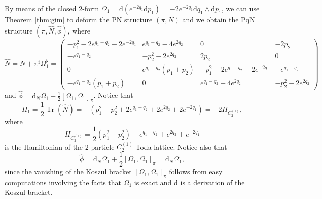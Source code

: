 \documentclass[12pt]{article}
\def\d{{\mathrm d}}
\def\Tr{\operatorname{Tr}}
\begin{document}
By means of the closed 2-form $\Omega_1=\d(e^{-2q_1}\d p_1)=-2e^{-2q_1}\d q_1\wedge \d p_1$, we can use Theorem 
\ref{thm:gim} to deform the PN structure $(\pi,N)$ and we obtain the PqN structure $(\pi,\widehat{N},\widehat{\phi})$, where \begin{equation}
\widehat{N}=N+\pi^{\sharp}\Omega_1^{\flat}=\left( \begin {array}{cc|cc}
-p_1^2-2e^{q_1-q_2}-2e^{-2q_1} & e^{q_1-q_2}-4e^{2q_2} & 0 & -2p_2\\
-e^{q_1-q_2} & -p_2^2-2e^{2q_2} & 2p_2 & 0\\
\hline
0 & e^{q_1-q_2}(p_1+p_2) & -p_1^2-2e^{q_1-q_2}-2e^{-2q_1} & -e^{q_1-q_2}\\
-e^{q_1-q_2}(p_1+p_2) & 0 & e^{q_1-q_2}-4e^{2q_2} & -p_2^2-2e^{2q_2}
\end{array}\right)
\label{eq: periodic C2 (1,1) tensor}
\end{equation}
and $\widehat{\phi}=\d_{N}\Omega_1+\frac{1}{2}\left[\Omega_1,\Omega_1\right]_\pi$. Notice that 
\[
H_1=
\frac{1}{2}\Tr(\widehat{N})=-\left(p_1^2+p_2^2+2e^{q_1-q_2}+2e^{2q_2}+2e^{-2q_1}\right)=-2H_{C_2^{(1)}},
\]
where
\[
H_{C_2^{(1)}}=\frac{1}{2}\left(p_1^2+p_2^2\right)+e^{q_1-q_2}+e^{2q_2}+e^{-2q_1}
\]
is the Hamiltonian of the 2-particle $C_2^{(1)}$-Toda lattice. Notice also that
\begin{equation}
\widehat{\phi}=\d_{N}\Omega_1+\frac{1}{2}{\left[\Omega_1,\Omega_1\right]_\pi}
=\d_{N}\Omega_1,\label{eq: 3-form C2}
\end{equation}
since the vanishing of the Koszul bracket $\left[\Omega_1,\Omega_1\right]_\pi$ follows from easy computations involving the facts that $\Omega_1$ is exact and $\d$ is a derivation of the Koszul bracket.
\end{document}
